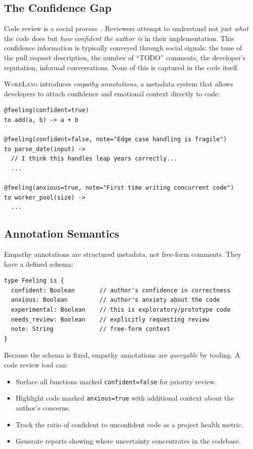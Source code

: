 \documentclass[11pt,a4paper]{article}
\newcommand{\WokeLang}{\textsc{WokeLang}}
\begin{document}
\subsection{The Confidence Gap}

Code review is a social process~\citep{rigby2013convergent}.
Reviewers attempt to understand not just \emph{what} the code does but
\emph{how confident the author is} in their implementation.  This
confidence information is typically conveyed through social signals:
the tone of the pull request description, the number of ``TODO''
comments, the developer's reputation, informal conversations.  None of
this is captured in the code itself.

\WokeLang{} introduces \emph{empathy annotations}, a metadata system
that allows developers to attach confidence and emotional context
directly to code:

\begin{lstlisting}[caption={Empathy annotations}]
@feeling(confident=true)
to add(a, b) -> a + b

@feeling(confident=false, note="Edge case handling is fragile")
to parse_date(input) ->
  // I think this handles leap years correctly...
  ...

@feeling(anxious=true, note="First time writing concurrent code")
to worker_pool(size) ->
  ...
\end{lstlisting}

\subsection{Annotation Semantics}

Empathy annotations are structured metadata, not free-form comments.
They have a defined schema:

\begin{lstlisting}[caption={Empathy annotation schema}]
type Feeling is {
  confident: Boolean       // author's confidence in correctness
  anxious: Boolean         // author's anxiety about the code
  experimental: Boolean    // this is exploratory/prototype code
  needs_review: Boolean    // explicitly requesting review
  note: String             // free-form context
}
\end{lstlisting}

Because the schema is fixed, empathy annotations are \emph{queryable}
by tooling.  A code review tool can:

\begin{itemize}[leftmargin=*]
  \item Surface all functions marked \texttt{confident=false} for
    priority review.
  \item Highlight code marked \texttt{anxious=true} with additional
    context about the author's concerns.
  \item Track the ratio of confident to unconfident code as a project
    health metric.
  \item Generate reports showing where uncertainty concentrates in the
    codebase.
\end{itemize}
\end{document}
